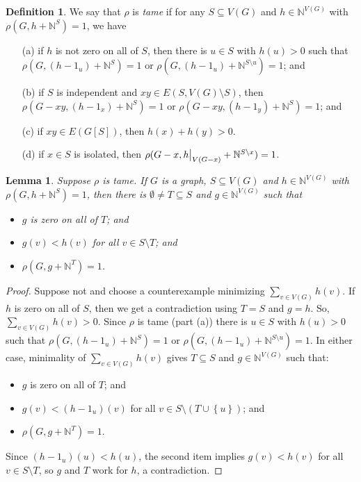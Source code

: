 \documentclass[12pt]{article}
\theoremstyle{plain}
\newtheorem{lem}[thm]{Lemma}
\theoremstyle{definition}
\newtheorem{defn}{Definition}
\theoremstyle{remark}
\newcommand{\IN}{\mathbb{N}}
\newcommand{\set}[1]{\left\{ #1 \right\}}
\newcommand\restr[2]{{%
  \left.\kern-\nulldelimiterspace %
  #1 %
  \vphantom{\big|} %
  \right|_{#2} %
  }}
\begin{document}
\begin{defn}\label{tame}
	We say that $\rho$ is \emph{tame} if for any $S \subseteq V(G)$ and $h \in \IN^{V(G)}$ with $\rho(G, h + \IN^S) = 1$, we have
\begin{enumerate}
	\item[(a)] if $h$ is not zero on all of $S$, then there is $u \in S$ with $h(u) > 0$ such that $\rho(G, (h - 1_u) + \IN^S) = 1$ or $\rho(G, (h - 1_u) + \IN^{S \setminus u}) = 1$; and
	\item[(b)] if $S$ is independent and $xy \in E(S, V(G)\setminus S)$, then $\rho(G-xy, (h - 1_x) + \IN^S) = 1$ or $\rho(G-xy, (h - 1_y) + \IN^S) = 1$; and
	\item[(c)] if $xy \in E(G[S])$, then $h(x) + h(y) > 0$.
	\item[(d)] if $x \in S$ is isolated, then $\rho(G - x, \restr{h}{V(G-x)} + \IN^{S\setminus x}) = 1$.
\end{enumerate}
\end{defn}

\begin{lem}\label{GetSuperStable}
	Suppose $\rho$ is tame. If $G$ is a graph, $S \subseteq V(G)$ and $h \in \IN^{V(G)}$ with $\rho(G, h + \IN^S) = 1$, then there is $\emptyset \ne T \subseteq S$ and $g \in \IN^{V(G)}$ such that
	\begin{itemize}
		\item $g$ is zero on all of $T$; and
		\item $g(v) < h(v)$ for all $v \in S\setminus T$; and
		\item $\rho(G, g + \IN^T) = 1$.
	\end{itemize}
\end{lem}
\begin{proof}
	Suppose not and choose a counterexample minimizing $\sum_{v \in V(G)} h(v)$.  If $h$ is zero on all of $S$, then we get a contradiction using $T = S$ and $g=h$.  So, $\sum_{v \in V(G)} h(v) > 0$. Since $\rho$ is tame (part (a)) there is $u \in S$ with $h(u) > 0$ such that $\rho(G, (h - 1_u) + \IN^S) = 1$ or $\rho(G, (h - 1_u) + \IN^{S \setminus u}) = 1$.  In either case, minimality of  $\sum_{v \in V(G)} h(v)$ gives $T \subseteq S$ and $g \in \IN^{V(G)}$ such that:
		\begin{itemize}
			\item $g$ is zero on all of $T$; and
			\item $g(v) < (h - 1_u)(v)$ for all $v \in S\setminus (T \cup \set{u})$; and
			\item $\rho(G, g + \IN^T) = 1$.
		\end{itemize}
		Since $(h - 1_u)(u) < h(u)$, the second item implies $g(v) < h(v)$ for all $v \in S\setminus T$, so $g$ and $T$ work for $h$, a contradiction.
\end{proof}
\end{document}
